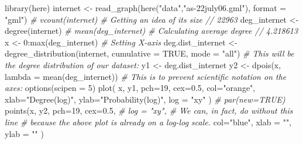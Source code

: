 \documentclass[
]{krantz}
\makeatletter
\newenvironment{Shaded}{\begin{snugshade}}{\end{snugshade}}
\newcommand{\AttributeTok}[1]{\textcolor[rgb]{0.61,0.61,0.61}{#1}}
\newcommand{\CommentTok}[1]{\textcolor[rgb]{0.37,0.37,0.37}{\textit{#1}}}
\newcommand{\ConstantTok}[1]{\textcolor[rgb]{0,0,0}{#1}}
\newcommand{\DecValTok}[1]{\textcolor[rgb]{0.06,0.06,0.06}{#1}}
\newcommand{\FloatTok}[1]{\textcolor[rgb]{0.06,0.06,0.06}{#1}}
\newcommand{\FunctionTok}[1]{\textcolor[rgb]{0,0,0}{#1}}
\newcommand{\NormalTok}[1]{#1}
\newcommand{\OtherTok}[1]{\textcolor[rgb]{0.37,0.37,0.37}{#1}}
\newcommand{\SpecialCharTok}[1]{\textcolor[rgb]{0,0,0}{#1}}
\newcommand{\StringTok}[1]{\textcolor[rgb]{0.5,0.5,0.5}{#1}}
\newenvironment{kframe}{%
\medskip{}
\setlength{\fboxsep}{.8em}
 \def\at@end@of@kframe{}%
 \ifinner\ifhmode%
  \def\at@end@of@kframe{\end{minipage}}%
  \begin{minipage}{\columnwidth}%
 \fi\fi%
 \def\FrameCommand##1{\hskip\@totalleftmargin \hskip-\fboxsep
 \colorbox{shadecolor}{##1}\hskip-\fboxsep
     \hskip-\linewidth \hskip-\@totalleftmargin \hskip\columnwidth}%
 \MakeFramed {\advance\hsize-\width
   \@totalleftmargin\z@ \linewidth\hsize
   \@setminipage}}%
 {\par\unskip\endMakeFramed%
 \at@end@of@kframe}
\renewenvironment{Shaded}{\begin{kframe}}{\end{kframe}}
\makeatother
\begin{document}
\begin{Shaded}
\begin{Highlighting}[]
\FunctionTok{library}\NormalTok{(here)}
\NormalTok{internet }\OtherTok{\textless{}{-}} \FunctionTok{read\_graph}\NormalTok{(}\FunctionTok{here}\NormalTok{(}\StringTok{"data"}\NormalTok{,}\StringTok{"as{-}22july06.gml"}\NormalTok{), }
                       \AttributeTok{format =} \StringTok{"gml"}\NormalTok{)}
\CommentTok{\# vcount(internet) \# Getting an idea of its size // 22963}
\NormalTok{deg\_internet }\OtherTok{\textless{}{-}} \FunctionTok{degree}\NormalTok{(internet)}
\CommentTok{\# mean(deg\_internet) \# Calculating average degree // 4.218613}
\NormalTok{x }\OtherTok{\textless{}{-}} \DecValTok{0}\SpecialCharTok{:}\FunctionTok{max}\NormalTok{(deg\_internet) }\CommentTok{\# Setting X{-}axis}
\NormalTok{deg.dist\_internet }\OtherTok{\textless{}{-}} \FunctionTok{degree\_distribution}\NormalTok{(internet, }
                                         \AttributeTok{cumulative =} \ConstantTok{TRUE}\NormalTok{, }
                                         \AttributeTok{mode =} \StringTok{"all"}\NormalTok{)}
\CommentTok{\# This will be the degree distribution of our dataset:}
\NormalTok{y1 }\OtherTok{\textless{}{-}}\NormalTok{ deg.dist\_internet }
\NormalTok{y2 }\OtherTok{\textless{}{-}} \FunctionTok{dpois}\NormalTok{(x, }\AttributeTok{lambda =} \FunctionTok{mean}\NormalTok{(deg\_internet))}
\CommentTok{\# This is to prevent scientific notation on the axes:}
\FunctionTok{options}\NormalTok{(}\AttributeTok{scipen =} \DecValTok{5}\NormalTok{) }
\FunctionTok{plot}\NormalTok{( x, y1, }\AttributeTok{pch=}\DecValTok{19}\NormalTok{, }\AttributeTok{cex=}\FloatTok{0.5}\NormalTok{, }
      \AttributeTok{col=}\StringTok{"orange"}\NormalTok{,}
      \AttributeTok{xlab=}\StringTok{"Degree(log)"}\NormalTok{, }
      \AttributeTok{ylab=}\StringTok{"Probability(log)"}\NormalTok{,}
      \AttributeTok{log =} \StringTok{"xy"}
\NormalTok{      )}
\CommentTok{\# par(new=TRUE) }
\FunctionTok{points}\NormalTok{(x, y2, }\AttributeTok{pch=}\DecValTok{19}\NormalTok{,}
     \AttributeTok{cex=}\FloatTok{0.5}\NormalTok{,}
     \CommentTok{\# log = "xy", \# We can, in fact, do without this line }
     \CommentTok{\# because the above plot is already on a log{-}log scale.}
     \AttributeTok{col=}\StringTok{"blue"}\NormalTok{,}
     \AttributeTok{xlab =} \StringTok{""}\NormalTok{, }
     \AttributeTok{ylab =} \StringTok{""}
\NormalTok{     )}
\end{Highlighting}
\end{Shaded}
\end{document}
